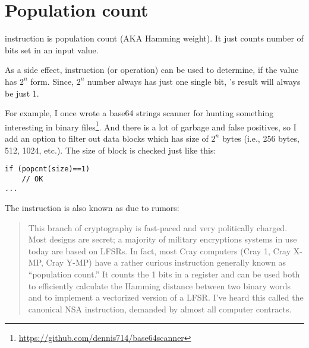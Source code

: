 \section{Population count}
\label{POPCNT}

 instruction is population count (\ac{AKA} Hamming weight).
It just counts number of bits set in an input value.

As a side effect,  instruction (or operation) can be used to determine, if the value has $2^n$ form.
Since, $2^n$ number always has just one single bit, 's result will always be just 1.

For example, I once wrote a base64 strings scanner for hunting something interesting in binary files\footnote{\url{https://github.com/dennis714/base64scanner}}.
And there is a lot of garbage and false positives, so I add an option to filter out data blocks which has size of $2^n$ bytes
(i.e., 256 bytes, 512, 1024, etc.).
The size of block is checked just like this:

\begin{lstlisting}[style=customc]
if (popcnt(size)==1)
	// OK
...
\end{lstlisting}

The instruction is also known as  due to rumors:

\begin{framed}
\begin{quotation}
  This branch of cryptography is fast-paced and very politically charged.
  Most designs are secret; a majority of military encryptions systems in use today are 
  based on LFSRs. 
  In fact, most Cray computers (Cray 1, Cray X-MP, Cray Y-MP) have a rather curious 
  instruction generally known as “population count.” It counts the 1 bits in a register 
  and can be used both to efficiently calculate the Hamming distance between two binary 
  words and to implement a vectorized version of a LFSR. I’ve heard this called the canonical 
  NSA instruction, demanded by almost all computer contracts.
\end{quotation}
\end{framed}
\InSqBrackets{\Schneier{}}

